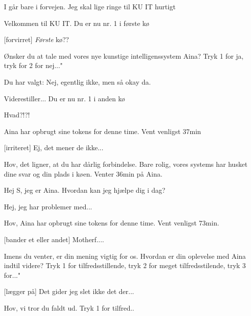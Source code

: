 \documentclass[a4paper,11pt]{article}
\begin{document}
\begin{sketch}

 I går bare i forvejen. Jeg skal lige ringe til KU IT hurtigt


 Velkommen til KU IT. Du er nu nr. 1 i første kø

[forvirret] \textit{Første} kø??

 Ønsker du at tale med vores nye kunstige intelligenssystem Aina? Tryk 1 for ja, tryk for 2 for nej..."


 Du har valgt: Nej, egentlig ikke, men så okay da. 

 Viderestiller... Du er nu nr. 1 i anden kø

 Hvad?!?!

 Aina har opbrugt sine tokens for denne time. Vent venligst 37min

[irriteret] Ej, det mener de ikke...


 Hov, det ligner, at du har dårlig forbindelse. Bare rolig, vores systems har husket dine svar og din plads i køen. Venter 36min på Aina.


 Hej S, jeg er Aina. Hvordan kan jeg hjælpe dig i dag?

 Hej, jeg har problemer med...


 Hov, Aina har opbrugt sine tokens for denne time. Vent venligst 73min.

[bander et eller andet] Motherf....

 Imens du venter, er din mening vigtig for os. Hvordan er din oplevelse med Aina indtil videre? Tryk 1 for tilfredsstillende, tryk 2 for meget tilfredsstilende, tryk 3 for..."

[lægger på] Det gider jeg slet ikke det der...


 Hov, vi tror du faldt ud. Tryk 1 for tilfred..



\end{sketch}
\end{document}
